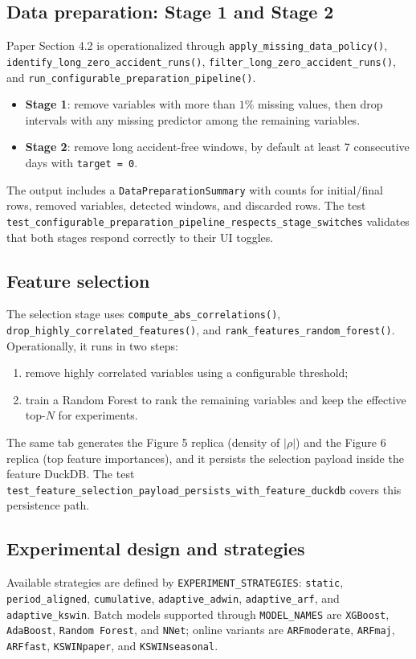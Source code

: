 \subsection{Data preparation: Stage 1 and Stage 2}
Paper Section 4.2 is operationalized through \texttt{apply\_missing\_data\_policy()}, \texttt{identify\_long\_zero\_accident\_runs()}, \texttt{filter\_long\_zero\_accident\_runs()}, and \texttt{run\_configurable\_preparation\_pipeline()}.

\begin{itemize}[leftmargin=*]
  \item \textbf{Stage 1}: remove variables with more than \(1\%\) missing values, then drop intervals with any missing predictor among the remaining variables.
  \item \textbf{Stage 2}: remove long accident-free windows, by default at least 7 consecutive days with \texttt{target = 0}.
\end{itemize}

The output includes a \texttt{DataPreparationSummary} with counts for initial/final rows, removed variables, detected windows, and discarded rows. The test \texttt{test\_configurable\_preparation\_pipeline\_respects\_stage\_switches} validates that both stages respond correctly to their UI toggles.

\subsection{Feature selection}
The selection stage uses \texttt{compute\_abs\_correlations()}, \texttt{drop\_highly\_correlated\_features()}, and \texttt{rank\_features\_random\_forest()}. Operationally, it runs in two steps:
\begin{enumerate}[leftmargin=*]
  \item remove highly correlated variables using a configurable threshold;
  \item train a Random Forest to rank the remaining variables and keep the effective top-$N$ for experiments.
\end{enumerate}

The same tab generates the Figure 5 replica (density of $|\rho|$) and the Figure 6 replica (top feature importances), and it persists the selection payload inside the feature DuckDB. The test \texttt{test\_feature\_selection\_payload\_persists\_with\_feature\_duckdb} covers this persistence path.

\subsection{Experimental design and strategies}
Available strategies are defined by \texttt{EXPERIMENT\_STRATEGIES}:
\texttt{static}, \texttt{period\_aligned}, \texttt{cumulative}, \texttt{adaptive\_adwin}, \texttt{adaptive\_arf}, and \texttt{adaptive\_kswin}. Batch models supported through \texttt{MODEL\_NAMES} are \texttt{XGBoost}, \texttt{AdaBoost}, \texttt{Random Forest}, and \texttt{NNet}; online variants are \texttt{ARFmoderate}, \texttt{ARFmaj}, \texttt{ARFfast}, \texttt{KSWINpaper}, and \texttt{KSWINseasonal}.

